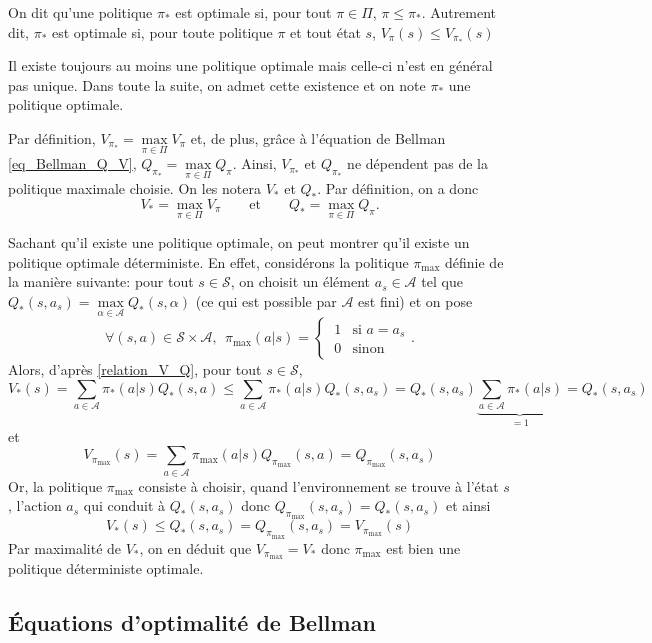 On dit qu'une politique $\pi_*$ est optimale si, pour tout $\pi\in\Pi$, $\pi \leqslant \pi_*$. Autrement dit, $\pi_*$ est optimale si, pour toute politique $\pi$ et tout état $s$, $V_{\pi}(s) \leqslant V_{\pi_*}(s)$

\bigskip

Il existe toujours au moins une politique optimale mais celle-ci n'est en général pas unique. Dans toute la suite, on admet cette existence et on note $\pi_*$ une politique optimale.

\bigskip

Par définition, $V_{\pi_*} = \mathop{\max}\limits_{\pi\in\Pi} V_{\pi}$ et, de plus, grâce à l'équation de Bellman \eqref{eq_Bellman_Q_V}, $Q_{\pi_*} = \mathop{\max}\limits_{\pi\in\Pi} Q_{\pi}$. Ainsi, $V_{\pi_*}$ et $Q_{\pi_*}$ ne dépendent pas de la politique maximale choisie. On les notera $V_*$ et $Q_*$. Par définition, on a donc
$$V_*=\mathop{\max}_{\pi\in\Pi} V_{\pi} \qquad \text{et} \qquad Q_*=\mathop{\max}_{\pi\in\Pi} Q_{\pi}.$$

Sachant qu'il existe une politique optimale, on peut montrer qu'il existe un politique optimale déterministe. En effet, considérons la politique $\pi_{\text{max}}$ définie de la manière suivante: pour tout $s\in\mathcal{S}$, on choisit un élément $a_s\in\mathcal{A}$ tel que $Q_{*}(s,a_s)=\mathop{\max}\limits_{\alpha\in \mathcal{A}} Q_{*}(s,\alpha)$ (ce qui est possible par $\mathcal{A}$ est fini) et on pose
$$\forall (s,a)\in\mathcal{S}\times\mathcal{A},~~\pi_{\max}(a|s)=\begin{cases} ~1 & \text{si } a=a_s \\ ~0 & \text{sinon}
\end{cases}.$$
Alors, d'après \eqref{relation_V_Q}, pour tout $s\in\mathcal{S}$,
$$V_{*}(s) = \sum_{a\in\mathcal{A}} \pi_*(a|s)Q_{*}(s,a) \leqslant \sum_{a\in\mathcal{A}} \pi_*(a|s) Q_{*}(s,a_s) = Q_{*}(s,a_s) \underbrace{\sum_{a\in\mathcal{A}} \pi_*(a|s)}_{=1} = Q_{*}(s,a_s)$$
et
$$V_{\pi_{\max}}(s) = \sum_{a\in\mathcal{A}} \pi_{\max}(a|s)Q_{\pi_{\max}}(s,a) = Q_{\pi_{\max}}(s,a_s)$$
Or, la politique $\pi_{\max}$ consiste à choisir, quand l'environnement se trouve à l'état $s$, l'action $a_s$ qui conduit à $Q_*(s, a_s)$ donc $Q_{\pi_{\max}}(s,a_s)=Q_*(s,a_s)$ et ainsi
$$V_*(s) \leqslant Q_{*}(s,a_s) = Q_{\pi_{\max}}(s,a_s) = V_{\pi_{\max}}(s)$$
Par maximalité de $V_*$, on en déduit que $V_{\pi_{\max}}=V_*$ donc $\pi_{\max}$ est bien une politique déterministe optimale. 

\subsection{\'Equations d'optimalité de Bellman}

